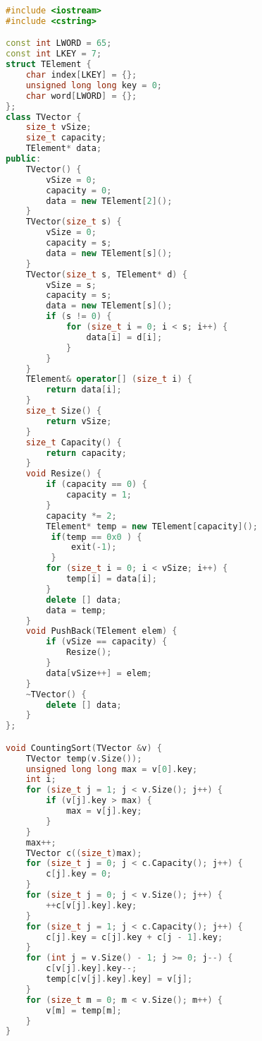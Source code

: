 \documentclass[pdf, unicode, 12pt, a4paper,oneside,fleqn]{article}
\begin{document}
\begin{lstlisting}[language=C++]
#include <iostream>
#include <cstring>

const int LWORD = 65;
const int LKEY = 7;
struct TElement {
    char index[LKEY] = {};
    unsigned long long key = 0;
    char word[LWORD] = {};
};
class TVector {
    size_t vSize;
    size_t capacity;
    TElement* data;
public:
    TVector() {
        vSize = 0;
        capacity = 0;
        data = new TElement[2]();
    }
    TVector(size_t s) {
        vSize = 0;
        capacity = s;
        data = new TElement[s]();
    }
    TVector(size_t s, TElement* d) {
        vSize = s;
        capacity = s;
        data = new TElement[s]();
        if (s != 0) {
            for (size_t i = 0; i < s; i++) {
                data[i] = d[i];
            }
        }
    }
    TElement& operator[] (size_t i) {
        return data[i];
    }
    size_t Size() {
        return vSize;
    }
    size_t Capacity() {
        return capacity;
    }
    void Resize() {
        if (capacity == 0) {
            capacity = 1;
        }
        capacity *= 2;
        TElement* temp = new TElement[capacity]();
         if(temp == 0x0 ) {
             exit(-1);
         }
        for (size_t i = 0; i < vSize; i++) {
            temp[i] = data[i];
        }
        delete [] data;
        data = temp;
    }
    void PushBack(TElement elem) {
        if (vSize == capacity) {
            Resize();
        }
        data[vSize++] = elem;
    }
    ~TVector() {
        delete [] data;
    }
};

void CountingSort(TVector &v) {
    TVector temp(v.Size());
    unsigned long long max = v[0].key;
    int i;
    for (size_t j = 1; j < v.Size(); j++) {
        if (v[j].key > max) {
            max = v[j].key;
        }
    }
    max++;
    TVector c((size_t)max);
    for (size_t j = 0; j < c.Capacity(); j++) {
        c[j].key = 0;
    }
    for (size_t j = 0; j < v.Size(); j++) {
        ++c[v[j].key].key;
    }
    for (size_t j = 1; j < c.Capacity(); j++) {
        c[j].key = c[j].key + c[j - 1].key;
    }
    for (int j = v.Size() - 1; j >= 0; j--) {
        c[v[j].key].key--;
        temp[c[v[j].key].key] = v[j];
    }
    for (size_t m = 0; m < v.Size(); m++) {
        v[m] = temp[m];
    }
}


\end{lstlisting}
\end{document}
